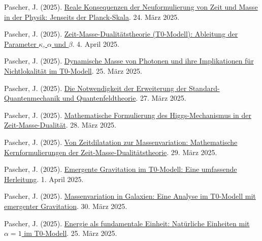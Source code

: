 \documentclass[a4paper,12pt]{article}
\begin{document}
\begin{thebibliography}{99}
		 Pascher, J. (2025). \href{https://github.com/jpascher/T0-Time-Mass-Duality/tree/main/2/pdf/Deutsch/JenseitsPlanck.pdf}{Reale Konsequenzen der Neuformulierung von Zeit und Masse in der Physik: Jenseits der Planck-Skala}. 24. März 2025.
		
		 Pascher, J. (2025). \href{https://github.com/jpascher/T0-Time-Mass-Duality/tree/main/2/pdf/Deutsch/ZeitMasseT0Params.pdf}{Zeit-Masse-Dualitätstheorie (T0-Modell): Ableitung der Parameter \(\kappa\), \(\alpha\) und \(\beta\)}. 4. April 2025.
		
		 Pascher, J. (2025). \href{https://github.com/jpascher/T0-Time-Mass-Duality/tree/main/2/pdf/Deutsch/DynMassePhotonenNichtlokal.pdf}{Dynamische Masse von Photonen und ihre Implikationen für Nichtlokalität im T0-Modell}. 25. März 2025.
		
		 Pascher, J. (2025). \href{https://github.com/jpascher/T0-Time-Mass-Duality/tree/main/2/pdf/Deutsch/NotwendigkeitQMErweiterung.pdf}{Die Notwendigkeit der Erweiterung der Standard-Quantenmechanik und Quantenfeldtheorie}. 27. März 2025.
		
		 Pascher, J. (2025). \href{https://github.com/jpascher/T0-Time-Mass-Duality/tree/main/2/pdf/Deutsch/MathHiggsZeitMasse.pdf}{Mathematische Formulierung des Higgs-Mechanismus in der Zeit-Masse-Dualität}. 28. März 2025.
		
		 Pascher, J. (2025). \href{https://github.com/jpascher/T0-Time-Mass-Duality/tree/main/2/pdf/Deutsch/MathZeitMasseLagrange.pdf}{Von Zeitdilatation zur Massenvariation: Mathematische Kernformulierungen der Zeit-Masse-Dualitätstheorie}. 29. März 2025.
		
		 Pascher, J. (2025). \href{https://github.com/jpascher/T0-Time-Mass-Duality/tree/main/2/pdf/Deutsch/EmergentGravT0.pdf}{Emergente Gravitation im T0-Modell: Eine umfassende Herleitung}. 1. April 2025.
		
		 Pascher, J. (2025). \href{https://github.com/jpascher/T0-Time-Mass-Duality/tree/main/2/pdf/Deutsch/MassVarGalaxien.pdf}{Massenvariation in Galaxien: Eine Analyse im T0-Modell mit emergenter Gravitation}. 30. März 2025.
		
		 Pascher, J. (2025). \href{https://github.com/jpascher/T0-Time-Mass-Duality/tree/main/2/pdf/Deutsch/NatEinheitenAlpha1.pdf}{Energie als fundamentale Einheit: Natürliche Einheiten mit \(\alpha = 1\) im T0-Modell}. 25. März 2025.
		

\end{thebibliography}
\end{document}
